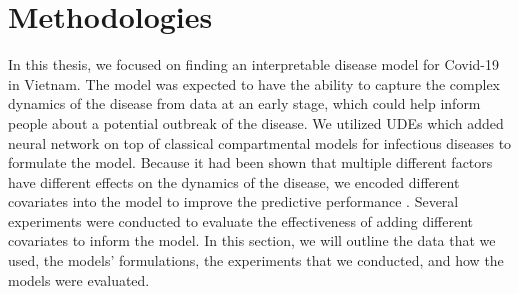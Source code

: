 \chapter{Methodologies}
\label{chap:methodologies}

In this thesis, we focused on finding an interpretable disease model for Covid-19 in Vietnam.
The model was expected to have the ability to capture the complex dynamics of the disease from data at an early stage, which could help inform people about a potential outbreak of the disease.
We utilized \glspl{UDE} which added neural network on top of classical compartmental models for infectious diseases to formulate the model.
Because it had been shown that multiple different factors have different effects on the dynamics of the disease, we encoded different covariates into the model to improve the predictive performance \cite{ihmecovid-19forecastingteamModelingCOVID19Scenarios2021,arikInterpretableSequenceLearning}.
Several experiments were conducted to evaluate the effectiveness of adding different covariates to inform the model.
In this section, we will outline the data that we used, the models' formulations, the experiments that we conducted, and how the models were evaluated.











